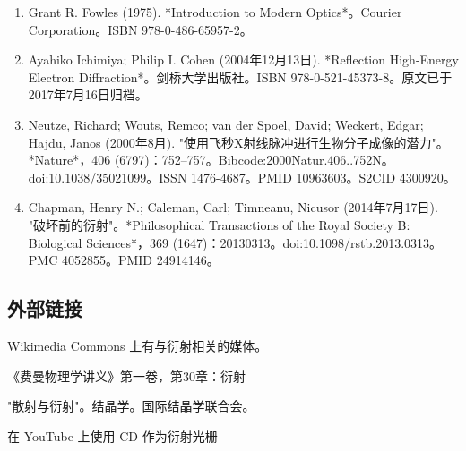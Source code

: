 \begin{enumerate}
\item Grant R. Fowles (1975). *Introduction to Modern Optics*。Courier Corporation。ISBN 978-0-486-65957-2。
\item Ayahiko Ichimiya; Philip I. Cohen (2004年12月13日). *Reflection High-Energy Electron Diffraction*。剑桥大学出版社。ISBN 978-0-521-45373-8。原文已于2017年7月16日归档。
\item Neutze, Richard; Wouts, Remco; van der Spoel, David; Weckert, Edgar; Hajdu, Janos (2000年8月). "使用飞秒X射线脉冲进行生物分子成像的潜力"。*Nature*，406 (6797)：752–757。Bibcode:2000Natur.406..752N。doi:10.1038/35021099。ISSN 1476-4687。PMID 10963603。S2CID 4300920。
\item Chapman, Henry N.; Caleman, Carl; Timneanu, Nicusor (2014年7月17日). "破坏前的衍射"。*Philosophical Transactions of the Royal Society B: Biological Sciences*，369 (1647)：20130313。doi:10.1098/rstb.2013.0313。PMC 4052855。PMID 24914146。
\end{enumerate}
\subsection{外部链接}

Wikimedia Commons 上有与衍射相关的媒体。

《费曼物理学讲义》第一卷，第30章：衍射

"散射与衍射"。结晶学。国际结晶学联合会。

在 YouTube 上使用 CD 作为衍射光栅

